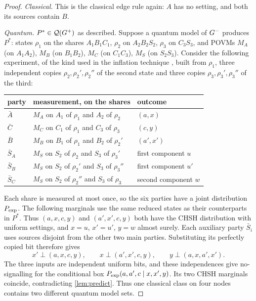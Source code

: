 \begin{proof}
\emph{Classical.} This is the classical edge rule again: $A$ has no setting, and both its sources contain $B$.

\emph{Quantum.} $P^{*}\in\mathcal{Q}(G^{+})$ as described. Suppose a quantum model of $G^{-}$ produces $P^{*}$: states
$\rho_1$ on the shares $A_1B_1C_1$, $\rho_2$ on $A_2B_2S_2$, $\rho_3$ on $C_3S_3$, and POVMs $M_A$ (on $A_1A_2$),
$M_B$ (on $B_1B_2$), $M_C$ (on $C_1C_3$), $M_S$ (on $S_2S_3$). Consider the following experiment, of the kind
used in the inflation technique \cite{Inflation}, built from $\rho_1$, three independent copies
$\rho_2,\rho_2',\rho_2''$ of the second state and three copies $\rho_3,\rho_3',\rho_3''$ of the third:
\begin{center}\small
\begin{tabular}{@{}lll@{}}
\toprule
party & measurement, on the shares & outcome\\
\midrule
$\bar A$ & $M_A$ on $A_1$ of $\rho_1$ and $A_2$ of $\rho_2$ & $(a,x)$\\
$\bar C$ & $M_C$ on $C_1$ of $\rho_1$ and $C_3$ of $\rho_3$ & $(c,y)$\\
$\bar B$ & $M_B$ on $B_1$ of $\rho_1$ and $B_2$ of $\rho_2'$ & $(a',x')$\\
$\bar S_A$ & $M_S$ on $S_2$ of $\rho_2$ and $S_3$ of $\rho_3'$ & first component $u$\\
$\bar S_B$ & $M_S$ on $S_2$ of $\rho_2'$ and $S_3$ of $\rho_3''$ & first component $u'$\\
$\bar S_C$ & $M_S$ on $S_2$ of $\rho_2''$ and $S_3$ of $\rho_3$ & second component $w$\\
\bottomrule
\end{tabular}
\end{center}
Each share is measured at most once, so the six parties have a joint distribution $P_{\rm exp}$.
The following marginals use the same reduced states as their counterparts in
$P^*$. Thus $(a,x,c,y)$ and $(a',x',c,y)$ both have the CHSH distribution with uniform settings,
and $x=u$, $x'=u'$, $y=w$ almost surely. Each auxiliary party $\bar S_i$ uses sources disjoint from
the other two main parties. Substituting its perfectly copied bit therefore gives
\[
 x'\perp(a,x,c,y),\qquad x\perp(a',x',c,y),\qquad y\perp(a,x,a',x').
\]
The three inputs are independent uniform bits, and these independences give no-signalling for the
conditional box $P_{\rm exp}(a,a',c\mid x,x',y)$. Its two CHSH marginals coincide, contradicting
\cref{lem:predict}. Thus one classical class on four nodes contains two different quantum model sets.
\end{proof}

